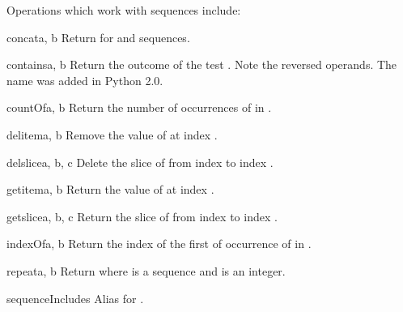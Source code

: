 Operations which work with sequences include:

\begin{funcdesc}{concat}{a, b}
Return  \code{+}  for  and  sequences.
\end{funcdesc}

\begin{funcdesc}{contains}{a, b}
Return the outcome of the test   .
Note the reversed operands.  The name  was
added in Python 2.0.
\end{funcdesc}

\begin{funcdesc}{countOf}{a, b}
Return the number of occurrences of  in .
\end{funcdesc}

\begin{funcdesc}{delitem}{a, b}
Remove the value of  at index .
\end{funcdesc}

\begin{funcdesc}{delslice}{a, b, c}
Delete the slice of  from index  to index .
\end{funcdesc}

\begin{funcdesc}{getitem}{a, b}
Return the value of  at index .
\end{funcdesc}

\begin{funcdesc}{getslice}{a, b, c}
Return the slice of  from index  to index .
\end{funcdesc}

\begin{funcdesc}{indexOf}{a, b}
Return the index of the first of occurrence of  in .
\end{funcdesc}

\begin{funcdesc}{repeat}{a, b}
Return  \code{*}  where  is a sequence and
 is an integer.
\end{funcdesc}

\begin{funcdesc}{sequenceIncludes}{\unspecified}
Alias for .
\end{funcdesc}

